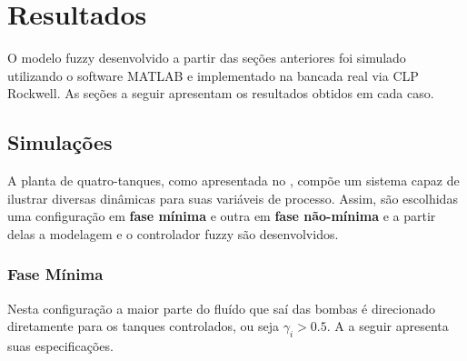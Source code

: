 %

\chapter{Resultados} \label{capRes}

O modelo fuzzy desenvolvido a partir das seções anteriores foi simulado utilizando o software MATLAB e implementado na bancada real via CLP Rockwell. As seções a seguir apresentam os resultados obtidos em cada caso.

\section{Simulações} \label{secAnalise}
A planta de quatro-tanques, como apresentada no , compõe um sistema capaz de ilustrar diversas dinâmicas para suas variáveis de processo. Assim, são escolhidas uma configuração em \textbf{fase mínima }e outra em \textbf{fase não-mínima} e a partir delas a modelagem e o controlador fuzzy são desenvolvidos. 

\subsection{Fase Mínima}
Nesta configuração a maior parte do fluído que saí das bombas é direcionado diretamente para os tanques controlados, ou seja $\gamma_i > 0.5$. A  a seguir apresenta suas especificações.

\begin{table}[!ht]
	\caption{Parâmetros da planta em fase mínima.}
	\label{tabFaseMinima}
	\small
	\centering
\end{table}

